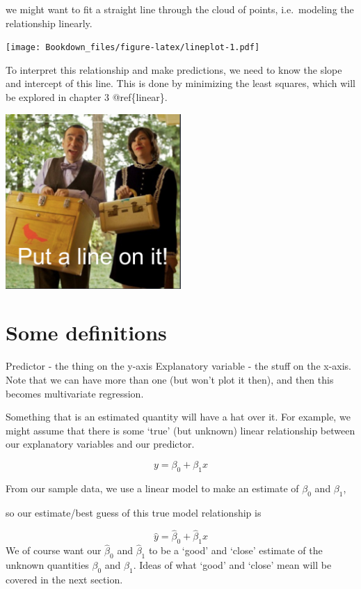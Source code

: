 \documentclass[
]{book}
\begin{document}
we might want to fit a straight line through the cloud of points, i.e.~modeling the relationship linearly.

\texttt{[image: Bookdown\_files/figure-latex/lineplot-1.pdf]}

To interpret this relationship and make predictions, we need to know the slope and intercept of this line. This is done by minimizing the least squares, which will be explored in chapter 3 @ref\{linear\}.

\includegraphics[width=0.5\textwidth,height=\textheight]{images/put_a_bird.png}

\hypertarget{some-definitions}{%
\section{Some definitions}\label{some-definitions}}

Predictor - the thing on the y-axis
Explanatory variable - the stuff on the x-axis. Note that we can have more than one (but won't plot it then), and then this becomes multivariate regression.

Something that is an estimated quantity will have a hat over it.
For example, we might assume that there is some `true' (but unknown) linear relationship between our explanatory variables and our predictor.

\[ y = \beta_0 + \beta_1 x\]

From our sample data, we use a linear model to make an estimate of \(\beta_0\) and \(\beta_1\),

so our estimate/best guess of this true model relationship is

\[ \hat y = \hat\beta_0 + \hat\beta_1 x\]
We of course want our \(\hat\beta_0\) and \(\hat\beta_1\) to be a `good' and `close' estimate of the unknown quantities \(\beta_0\) and \(\beta_1\). Ideas of what `good' and `close' mean will be covered in the next section.
\end{document}
